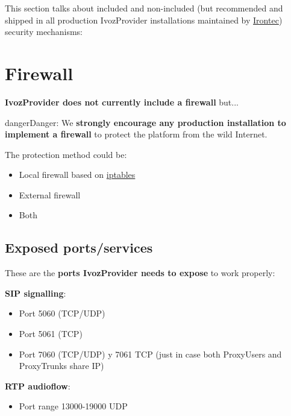 \documentclass[letterpaper,10pt,english]{sphinxmanual}
\begin{document}
This section talks about included and non-included (but recommended and shipped in all production IvozProvider
installations maintained by \href{https://www.irontec.com}{Irontec}) security mechanisms:


\section{Firewall}
\label{security_and_maintenance/security/firewall:firewall}\label{security_and_maintenance/security/firewall::doc}
\textbf{IvozProvider does not currently include a firewall} but...

\begin{notice}{danger}{Danger:}
We \textbf{strongly encourage any production installation to implement
a firewall} to protect the platform from the wild Internet.
\end{notice}

The protection method could be:
\begin{itemize}
\item {} 
Local firewall based on \href{https://www.netfilter.org/}{iptables}

\item {} 
External firewall

\item {} 
Both

\end{itemize}


\subsection{Exposed ports/services}
\label{security_and_maintenance/security/firewall:exposed-ports-services}
These are the \textbf{ports IvozProvider needs to expose} to work properly:

\textbf{SIP signalling}:
\begin{itemize}
\item {} 
Port 5060 (TCP/UDP)

\item {} 
Port 5061 (TCP)

\item {} 
Port 7060 (TCP/UDP) y 7061 TCP (just in case both ProxyUsers and ProxyTrunks share IP)

\end{itemize}

\textbf{RTP audioflow}:
\begin{itemize}
\item {} 
Port range 13000-19000 UDP

\end{itemize}
\end{document}
